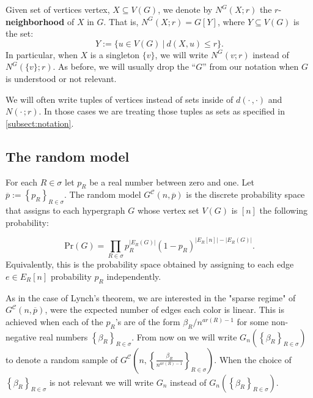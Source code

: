 \documentclass[12pt,notitlepage,a4paper]{article}
\theoremstyle{definition}
\newcommand{\InR}[1]{\left\{ #1_R \right\}_{R\in \sigma}}
\begin{document}
Given set of vertices vertex, $X\subseteq V(G)$, 
we denote by $N^G(X;r)$ the $r$-\textbf{neighborhood} of $X$ in 
$G$. That is,  $N^G(X;r)= G[Y]$, where $Y\subseteq V(G)$ is 
the set:
\[ Y:= \{ u \in V(G) \ | \ d(X,u)\leq r   \}. \]
In particular, when $X$ is a singleton $\{v\}$, we
will write $N^G(v;r)$ instead of $N^G(\{v\};r)$.
As before, we will usually drop the ``$G$'' from our 
notation when $G$ is understood or not relevant.  \par

We will often write tuples of vertices instead of sets
inside of $d(\cdot\, , \cdot)$ and $N(\cdot\, ;r)$. In those cases
we are treating those tuples as sets as specified in
\cref{subsect:notation}. 

\subsection{The random model}

For each $R\in \sigma$ let
$p_R$ be a real number between zero and one.
Let $\overline{p}:=\InR{p}$.
The random model $G^{\mathcal{C}}(n,\overline{p})$ 
is the discrete probability space that
assigns to each hypergraph $G$ whose vertex
set $V(G)$ is $[n]$ the following probability:

\[ \mathrm{Pr}(G)=\prod_{R\in \sigma} p_R^{|E_R(G)|}
(1-p_R)^{ \big|E_R[n]\big|-\big|E_R(G)\big|}.	
\]
Equivalently, this is the probability space obtained by 
assigning to each edge $e\in E_R[n]$ probability 
$p_R$ independently. \par

As in the case of Lynch's theorem, we are interested in the
"sparse regime" of $G^\mathcal{C}(n,\overline{p})$, were the 
expected number of edges each color is linear. 
This is achieved when each of the $p_R$'s are 
of the form $\beta_R/n^{ar(R)-1}$ for some 
non-negative real numbers $\InR{\beta}$.
From now on we will write $G_n\left(\InR{\beta}\right)$
to denote a random sample of 
$G^\mathcal{C}\left(n,\left\{ \frac{
\beta_R}{n^{ar(R)-1}}\right\}_{R\in\sigma}\right)$.
When the choice of $\InR{\beta}$ is not relevant
we will write $G_n$ instead of 
$G_n\left(\InR{\beta}\right)$.\par
\end{document}
